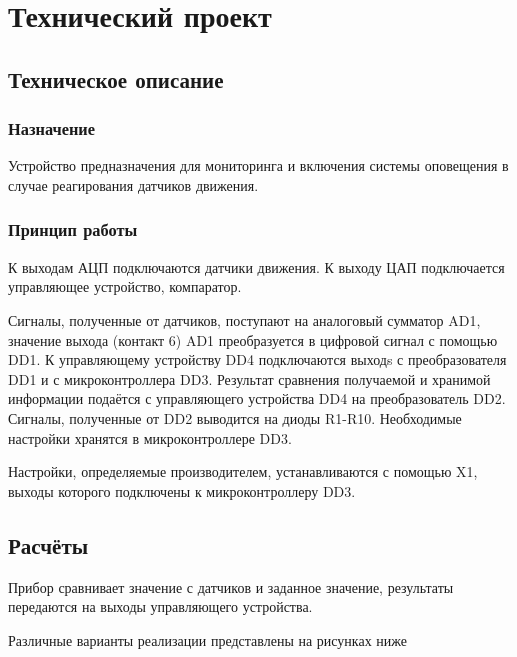 \chapter{Технический проект}
	\section{Техническое описание}
		\subsection{Назначение}
				Устройство предназначения для мониторинга и включения системы оповещения в случае
			реагирования датчиков движения.
		\subsection{Принцип работы}
				К выходам АЦП подключаются датчики движения. К выходу ЦАП подключается
			управляющее устройство, компаратор.

				Сигналы, полученные от датчиков, поступают на аналоговый сумматор AD1, значение
			выхода (контакт 6) AD1 преобразуется в цифровой сигнал с помощью DD1. К
			управляющему устройству DD4 подключаются выходs с преобразователя DD1 и с микроконтроллера
			DD3. Результат сравнения получаемой и хранимой информации подаётся с управляющего
			устройства DD4 на преобразователь DD2. Сигналы, полученные от DD2 выводится на диоды
			R1-R10. Необходимые настройки хранятся в микроконтроллере DD3.

				Настройки, определяемые производителем, устанавливаются с помощью X1, выходы
			которого подключены к микроконтроллеру DD3.
	\section{Расчёты}
			Прибор сравнивает значение с датчиков и заданное значение, результаты передаются на
		выходы управляющего устройства.

			Различные варианты реализации представлены на рисунках ниже
